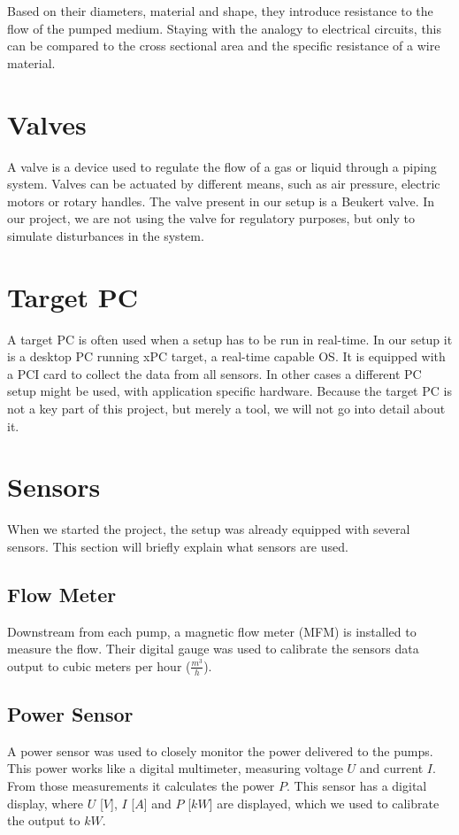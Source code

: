 Based on their diameters, material and shape,
they introduce resistance to the flow of the pumped medium.
Staying with the analogy to electrical circuits,
this can be compared to the cross sectional area and the specific resistance of a wire material.

\section{Valves}
A valve is a device used to regulate the flow of a gas or liquid through a piping system.
Valves can be actuated by different means, such as air pressure, electric motors or rotary handles.
The valve present in our setup is a Beukert valve. 
In our project, we are not using the valve for regulatory purposes,
but only to simulate disturbances in the system.


\section{Target PC}
A target PC is often used when a setup has to be run in real-time.
In our setup it is a desktop PC running xPC target,
a real-time capable OS.
It is equipped with a PCI card to collect the data from all sensors.
In other cases a different PC setup might be used,
with application specific hardware.
Because the target PC is not a key part of this project,
but merely a tool,
we will not go into detail about it.

\section{Sensors}
When we started the project,
the setup was already equipped with several sensors.
This section will briefly explain what sensors are used.

\subsection*{Flow Meter}
Downstream from  each pump, a magnetic flow meter (MFM) is installed to measure the flow.
Their digital gauge was used to calibrate the sensors data output to cubic meters per hour ($\frac{m^3}{h}$).

\subsection*{Power Sensor}
A power sensor was used to closely monitor the power delivered to the pumps.
This power works like a digital multimeter,
measuring voltage $U$ and current $I$.
From those measurements it calculates the power $P$.
This sensor has a digital display, where $U$ [$V$], $I$ [$A$] and $P$ [$kW$] are displayed,
which we used to calibrate the output to $kW$.

